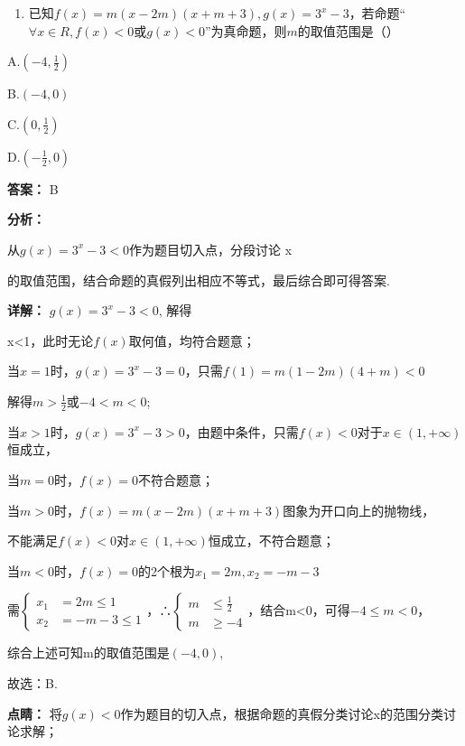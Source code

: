 \documentclass[11pt,a4paper]{ctexart}
\begin{document}
\begin{enumerate}[label=\arabic*., leftmargin=*]
\item 已知\(f(x) = m(x - 2m)(x + m + 3), g(x) = 3^x - 3\)，若命题``\(\forall x \in R, f(x) < 0\)或\(g(x) < 0\)''为真命题，则\(m\)的取值范围是（）
\end{enumerate}

A.\(\left(-4,\frac{1}{2}\right)\)

B.\((-4,0)\)

C.\(\left(0, \frac{1}{2}\right)\)

D.\(\left(-\frac{1}{2},0\right)\)

\textbf{答案：}
B

\textbf{分析：}

从\(g(x)=3^{x}-3<0\)作为题目切入点，分段讨论 x

的取值范围，结合命题的真假列出相应不等式，最后综合即可得答案.

\textbf{详解：}
\(g(x)=3^{x}-3<0\), 解得

x\textless1，此时无论\(f(x)\)取何值，均符合题意；

当\(x = 1\)时，\(g(x) = 3^x - 3 = 0\)，只需\(f(1) = m(1 - 2m)(4 + m) < 0\)

解得\(m > \frac{1}{2}\)或\(-4 < m < 0\);

当\(x > 1\)时，\(g(x) = 3^x - 3 > 0\)，由题中条件，只需\(f(x) < 0\)对于\(x \in (1, +\infty)\)恒成立，

当\(m = 0\)时，\(f(x) = 0\)不符合题意；

当\(m > 0\)时，\(f(x) = m(x - 2m)(x + m + 3)\)图象为开口向上的抛物线，

不能满足\(f(x) < 0\)对\(x \in (1, +\infty)\)恒成立，不符合题意；

当\(m < 0\)时，\(f(x) = 0\)的2个根为\(x_{1} = 2m, x_{2} = -m - 3\)

需\(\left\{\begin{aligned}x_{1}&=2m\leqslant1\\ x_{2}&=-m-3\leqslant1\end{aligned}\right.\)，∴\(\left\{\begin{aligned}m&\leqslant\frac{1}{2}\\ m&\geqslant-4\end{aligned}\right.\)，结合m\textless0，可得\(-4\leqslant m<0\)，

综合上述可知m的取值范围是\((-4,0)\),

故选：B.

\textbf{点睛：}
将\(g(x)<0\)作为题目的切入点，根据命题的真假分类讨论x的范围分类讨论求解；
\end{document}
